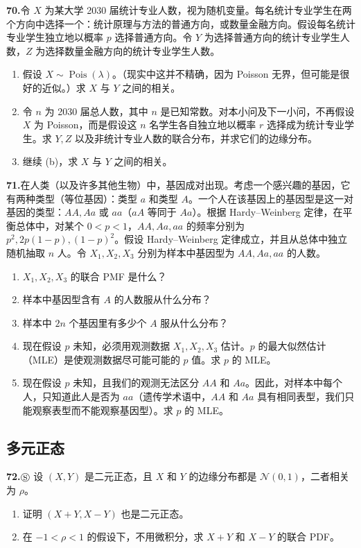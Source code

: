 \documentclass[UTF8,12pt,a4paper,fontset=fandol]{ctexart}
\begin{document}
\noindent\textbf{70.}\quad 令 $X$ 为某大学 2030 届统计专业人数，视为随机变量。每名统计专业学生在两个方向中选择一个：统计原理与方法的普通方向，或数量金融方向。假设每名统计专业学生独立地以概率 $p$ 选择普通方向。令 $Y$ 为选择普通方向的统计专业学生人数，$Z$ 为选择数量金融方向的统计专业学生人数。
\begin{enumerate}
  \item[(a)] 假设 $X\sim \operatorname{Pois}(\lambda)$。（现实中这并不精确，因为 Poisson 无界，但可能是很好的近似。）求 $X$ 与 $Y$ 之间的相关。
  \item[(b)] 令 $n$ 为 2030 届总人数，其中 $n$ 是已知常数。对本小问及下一小问，不再假设 $X$ 为 Poisson，而是假设这 $n$ 名学生各自独立地以概率 $r$ 选择成为统计专业学生。求 $Y,Z$ 以及非统计专业人数的联合分布，并求它们的边缘分布。
  \item[(c)] 继续 (b)，求 $X$ 与 $Y$ 之间的相关。
\end{enumerate}

\noindent\textbf{71.}\quad 在人类（以及许多其他生物）中，基因成对出现。考虑一个感兴趣的基因，它有两种类型（等位基因）：类型 $a$ 和类型 $A$。一个人在该基因上的基因型是这一对基因的类型：$AA,Aa$ 或 $aa$（$aA$ 等同于 $Aa$）。根据 Hardy--Weinberg 定律，在平衡总体中，对某个 $0<p<1$，$AA,Aa,aa$ 的频率分别为 $p^2,2p(1-p),(1-p)^2$。假设 Hardy--Weinberg 定律成立，并且从总体中独立随机抽取 $n$ 人。令 $X_1,X_2,X_3$ 分别为样本中基因型为 $AA,Aa,aa$ 的人数。
\begin{enumerate}
  \item[(a)] $X_1,X_2,X_3$ 的联合 PMF 是什么？
  \item[(b)] 样本中基因型含有 $A$ 的人数服从什么分布？
  \item[(c)] 样本中 $2n$ 个基因里有多少个 $A$ 服从什么分布？
  \item[(d)] 现在假设 $p$ 未知，必须用观测数据 $X_1,X_2,X_3$ 估计。$p$ 的最大似然估计（MLE）是使观测数据尽可能可能的 $p$ 值。求 $p$ 的 MLE。
  \item[(e)] 现在假设 $p$ 未知，且我们的观测无法区分 $AA$ 和 $Aa$。因此，对样本中每个人，只知道此人是否为 $aa$（遗传学术语中，$AA$ 和 $Aa$ 具有相同表型，我们只能观察表型而不能观察基因型）。求 $p$ 的 MLE。
\end{enumerate}

\subsection*{多元正态}

\noindent\textbf{72.}\quad $\circledS$ 设 $(X,Y)$ 是二元正态，且 $X$ 和 $Y$ 的边缘分布都是 $\mathcal{N}(0,1)$，二者相关为 $\rho$。
\begin{enumerate}
  \item[(a)] 证明 $(X+Y,X-Y)$ 也是二元正态。
  \item[(b)] 在 $-1<\rho<1$ 的假设下，不用微积分，求 $X+Y$ 和 $X-Y$ 的联合 PDF。
\end{enumerate}
\end{document}
